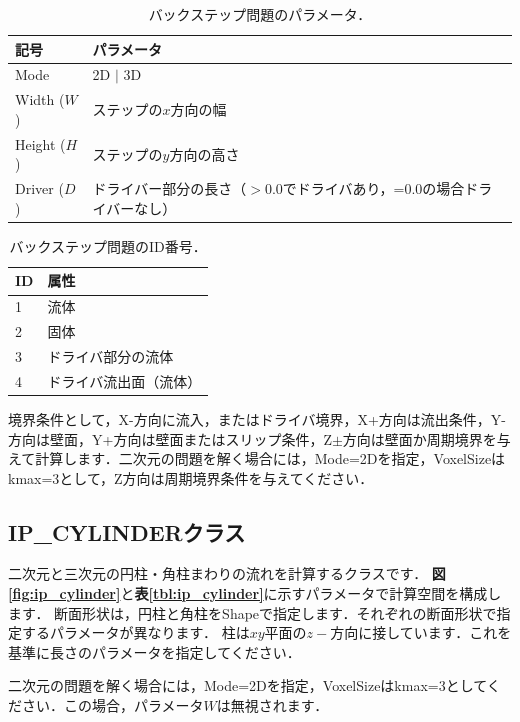 \begin{table}[htdp]
\small
\caption{バックステップ問題のパラメータ．}
\begin{center}
\begin{tabular}{ll}\toprule
記号 & パラメータ\\ \midrule
Mode & 2D $|$ 3D\\ \hline
Width ($W$) & ステップの$x$方向の幅\\
Height ($H$) & ステップの$y$方向の高さ\\
Driver ($D$) & ドライバー部分の長さ（$>0.0$でドライバあり，=0.0の場合ドライバーなし）\\
\bottomrule
\end{tabular}
\end{center}
\label{tbl:ip_backstep}
\end{table}

\begin{table}[htdp]
\small
\caption{バックステップ問題のID番号．}
\begin{center}
\begin{tabular}{ll}\toprule
ID & 属性\\ \midrule
1 & 流体\\
2 & 固体\\
3 & ドライバ部分の流体\\
4 & ドライバ流出面（流体）\\
\bottomrule
\end{tabular}
\end{center}
\label{tbl:ip_backstep_ID}
\end{table}

境界条件として，X-方向に流入，またはドライバ境界，X+方向は流出条件，Y-方向は壁面，Y+方向は壁面またはスリップ条件，Z$\pm$方向は壁面か周期境界を与えて計算します．二次元の問題を解く場合には，Mode=2Dを指定，VoxelSizeはkmax=3として，Z方向は周期境界条件を与えてください．

%
\subsection{IP\_CYLINDERクラス}
二次元と三次元の円柱・角柱まわりの流れを計算するクラスです．
\textbf{図\ref{fig:ip_cylinder}}と\textbf{表\ref{tbl:ip_cylinder}}に示すパラメータで計算空間を構成します．
断面形状は，円柱と角柱をShapeで指定します．それぞれの断面形状で指定するパラメータが異なります．
柱は$xy$平面の$z-$方向に接しています．これを基準に長さのパラメータを指定してください．

二次元の問題を解く場合には，Mode=2Dを指定，VoxelSizeはkmax=3としてください．この場合，パラメータ$W$は無視されます．

